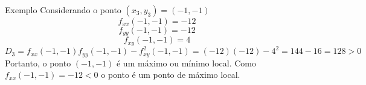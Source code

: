 \begin{frame}{Exemplo \theexemplo}
  Considerando o ponto \((x_3, y_3) = (-1, -1)\)
  \[
  f_{xx}(-1, -1) = -12
  \]
  \[
  f_{yy}(-1, -1) = -12
  \]
  \[
  f_{xy}(-1, -1) = 4
  \]
  \[
  D_3
  = f_{xx}(-1, -1)f_{yy}(-1, -1) - f^2_{xy}(-1, -1)
  = (-12)(-12) - 4^2
  = 144 -16
  = 128 > 0
  \]
  Portanto, o ponto $(-1, -1)$ é um máximo ou mínimo local. Como \(f_{xx}(-1, -1) = -12 < 0\)
  o ponto é um ponto de máximo local.
\end{frame}
